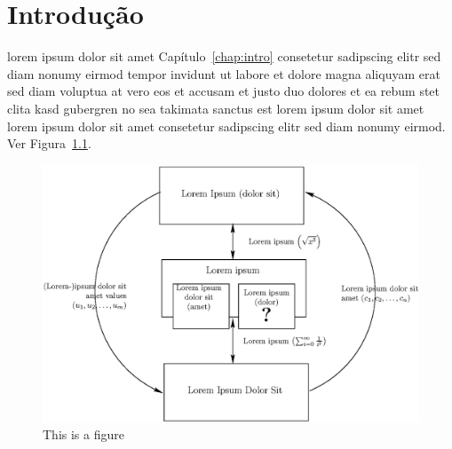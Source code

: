 \chapter{\label{chap:intro}Introdução}
%
%
%
%
%
%
%
%
lorem ipsum dolor sit amet Capítulo~\ref{chap:intro} consetetur
sadipscing elitr sed diam nonumy eirmod tempor invidunt ut labore
et dolore magna aliquyam erat sed diam voluptua at vero eos et
accusam et justo duo dolores et ea rebum stet clita kasd gubergren
no sea takimata sanctus est lorem ipsum dolor sit amet lorem ipsum
dolor sit amet consetetur sadipscing elitr sed diam nonumy eirmod.
Ver Figura~\ref{fig:fig1}.

\begin{figure}[htb!]
\centering\includegraphics[width=.65\textwidth]{fig/exemplo.eps}
\caption{\label{fig:fig1}This is a figure}
\end{figure}

